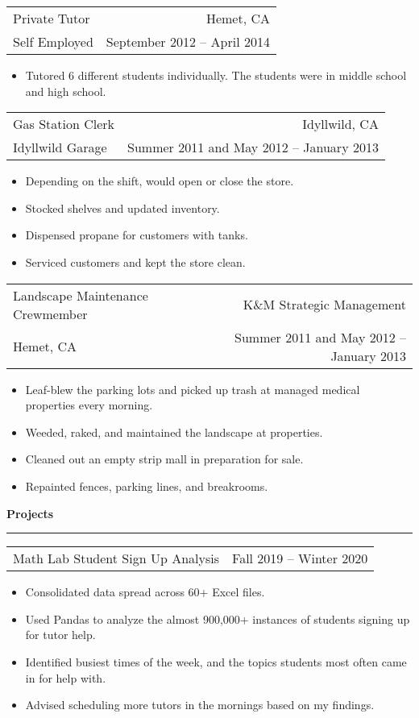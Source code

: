 \documentclass{article}
\newenvironment{compactItemize}{
  \begin{itemize}[itemsep=0ex, parsep=0ex, partopsep=0ex, topsep= -7pt]
}{
  \end{itemize}
}
\newcommand{\jobInfo}[4]{
  \begingroup
  \setlength{\tabcolsep}{0ex}
  \begin{tabularx}{\linewidth}{X r}
    #1 & %
    #2\\ %
    #3 & %
    #4   %
  \end{tabularx}%
  \endgroup%
}
\newcommand{\project}[2]{
  \begingroup
  \setlength{\tabcolsep}{0ex}
  \begin{tabularx}{\linewidth}{X r}
    #1 & %
    #2\\ %
  \end{tabularx}%
  \endgroup%
}
\begin{document}
\jobInfo{Private Tutor}{Hemet, CA}{Self Employed}{September 2012 -- April 2014}
\begin{compactItemize}
  \item Tutored 6 different students individually.  The students were in middle school and high school. 
\end{compactItemize}
\medskip

\jobInfo{Gas Station Clerk}{Idyllwild, CA}{Idyllwild Garage}{Summer 2011 and May 2012 -- January 2013}
\begin{compactItemize}
  \item Depending on the shift, would open or close the store.
  \item Stocked shelves and updated inventory.
  \item Dispensed propane for customers with tanks.
  \item Serviced customers and kept the store clean.
\end{compactItemize}
\medskip

\jobInfo{Landscape Maintenance Crewmember}{K\&M Strategic Management}{Hemet, CA}{Summer 2011 and May 2012 -- January 2013}
\begin{compactItemize}
  \item Leaf-blew the parking lots and picked up trash at managed medical properties every morning.
  \item Weeded, raked, and maintained the landscape at properties.
  \item Cleaned out an empty strip mall in preparation for sale.
  \item Repainted fences, parking lines, and breakrooms.
\end{compactItemize}
\medskip

\textbf{Projects %
}
\smallskip
\hrule

\project{Math Lab Student Sign Up Analysis}{Fall 2019 -- Winter 2020}
\begin{compactItemize}
  \item Consolidated data spread across 60+ Excel files.
  \item Used Pandas to analyze the almost 900,000+ instances of students signing up for tutor help.
  \item Identified busiest times of the week, and the topics students most often came in for help with.
  \item Advised scheduling more tutors in the mornings based on my findings.
\end{compactItemize}
\medskip
\end{document}
